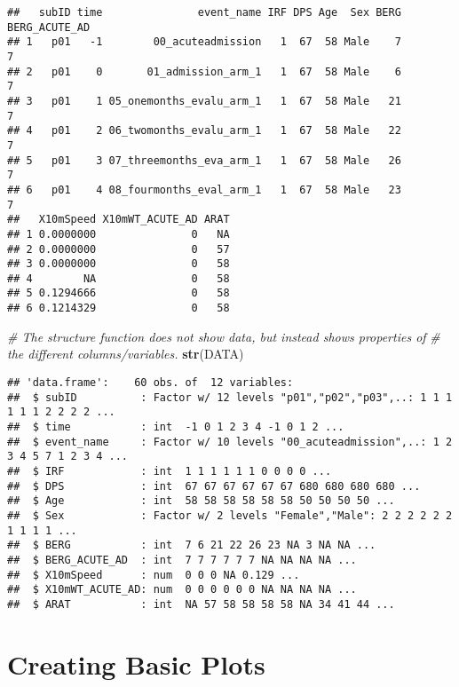 \documentclass[]{article}
\newenvironment{Shaded}{\begin{snugshade}}{\end{snugshade}}
\newcommand{\KeywordTok}[1]{\textcolor[rgb]{0.13,0.29,0.53}{\textbf{{#1}}}}
\newcommand{\CommentTok}[1]{\textcolor[rgb]{0.56,0.35,0.01}{\textit{{#1}}}}
\newcommand{\NormalTok}[1]{{#1}}
\begin{document}
\begin{verbatim}
##   subID time               event_name IRF DPS Age  Sex BERG BERG_ACUTE_AD
## 1   p01   -1        00_acuteadmission   1  67  58 Male    7             7
## 2   p01    0       01_admission_arm_1   1  67  58 Male    6             7
## 3   p01    1 05_onemonths_evalu_arm_1   1  67  58 Male   21             7
## 4   p01    2 06_twomonths_evalu_arm_1   1  67  58 Male   22             7
## 5   p01    3 07_threemonths_eva_arm_1   1  67  58 Male   26             7
## 6   p01    4 08_fourmonths_eval_arm_1   1  67  58 Male   23             7
##   X10mSpeed X10mWT_ACUTE_AD ARAT
## 1 0.0000000               0   NA
## 2 0.0000000               0   57
## 3 0.0000000               0   58
## 4        NA               0   58
## 5 0.1294666               0   58
## 6 0.1214329               0   58
\end{verbatim}

\begin{Shaded}
\begin{Highlighting}[]
\CommentTok{# The structure function does not show data, but instead shows properties of }
\CommentTok{# the different columns/variables.}
\KeywordTok{str}\NormalTok{(DATA)}
\end{Highlighting}
\end{Shaded}

\begin{verbatim}
## 'data.frame':    60 obs. of  12 variables:
##  $ subID          : Factor w/ 12 levels "p01","p02","p03",..: 1 1 1 1 1 1 2 2 2 2 ...
##  $ time           : int  -1 0 1 2 3 4 -1 0 1 2 ...
##  $ event_name     : Factor w/ 10 levels "00_acuteadmission",..: 1 2 3 4 5 7 1 2 3 4 ...
##  $ IRF            : int  1 1 1 1 1 1 0 0 0 0 ...
##  $ DPS            : int  67 67 67 67 67 67 680 680 680 680 ...
##  $ Age            : int  58 58 58 58 58 58 50 50 50 50 ...
##  $ Sex            : Factor w/ 2 levels "Female","Male": 2 2 2 2 2 2 1 1 1 1 ...
##  $ BERG           : int  7 6 21 22 26 23 NA 3 NA NA ...
##  $ BERG_ACUTE_AD  : int  7 7 7 7 7 7 NA NA NA NA ...
##  $ X10mSpeed      : num  0 0 0 NA 0.129 ...
##  $ X10mWT_ACUTE_AD: num  0 0 0 0 0 0 NA NA NA NA ...
##  $ ARAT           : int  NA 57 58 58 58 58 NA 34 41 44 ...
\end{verbatim}

\newpage

\section{Creating Basic Plots}\label{creating-basic-plots}
\end{document}
